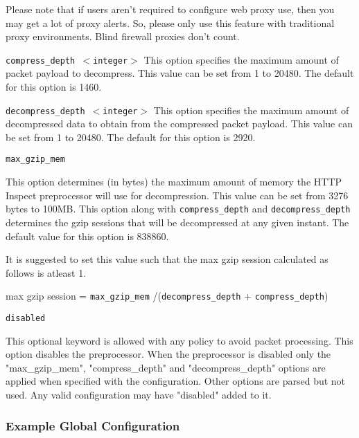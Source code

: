 \documentclass[english]{report}
\newcounter{slistnum}
\newenvironment{slist}
{ \begin{list}{ {\bf \arabic{slistnum}.} }{\usecounter{slistnum} } }
{ \end{list} }
\newenvironment{note}{
\samepage
    \vspace{10pt}{\textsf{
        {\hspace{7pt}\Huge{$\triangle$\hspace{-12.5pt}{\Large{$^!$}}}}\hspace{5pt}
        {\Large{NOTE}}
    }
    }
   \begin{center}
    \par\vspace{-17pt}

    \begin{lrbox}{\savepar}
    \begin{minipage}[r]{6in}
}
{
    \end{minipage}
    \end{lrbox}
    \fbox{
        \usebox{
            \savepar
	}
    }
    \par\vskip10pt
    \end{center}
}
\newenvironment{note}{
        \begin{rawhtml}
        <p><table border="1"><tr><td><b>
        Note:&nbsp;&nbsp;</b>
        \end{rawhtml}
}{
        \begin{rawhtml}
        </b></td></tr></table></p>
        \end{rawhtml}
}
\begin{document}
\begin{slist}
Please note that if users aren't required to configure web proxy use, then you
may get a lot of proxy alerts.  So, please only use this feature with
traditional proxy environments. Blind firewall proxies don't count.

\item \texttt{compress\_depth $<$integer$>$}
This option specifies the maximum amount of packet payload to decompress. This
value can be set from 1 to 20480. The default for this option is 1460.

\item \texttt{decompress\_depth $<$integer$>$}
This option specifies the maximum amount of decompressed data to obtain from the
compressed packet payload. This value can be set from 1 to 20480. The default for
this option is 2920.

\item \texttt{max\_gzip\_mem}

This option determines (in bytes) the maximum amount of memory the HTTP Inspect 
preprocessor will use for decompression. This value can be set from 3276 bytes 
to 100MB. This option along with \texttt{compress\_depth} and \texttt{decompress\_depth} 
determines the gzip sessions that will be decompressed at any given instant. The default 
value for this option is 838860.

\begin{note}

It is suggested to set this value such that the max gzip session calculated as
follows is atleast 1.

max gzip session = \texttt{max\_gzip\_mem} /(\texttt{decompress\_depth} + \texttt{compress\_depth})

\end{note}

\item \texttt{disabled}

This optional keyword is allowed with any policy to avoid packet processing.
This option disables the preprocessor. When the preprocessor is disabled
only the "max\_gzip\_mem", "compress\_depth" and "decompress\_depth" options
are applied when specified with the configuration. Other options are
parsed but not used. Any valid configuration may have "disabled" added to it.

\end{slist}
\subsubsection{Example Global Configuration}
\end{document}
